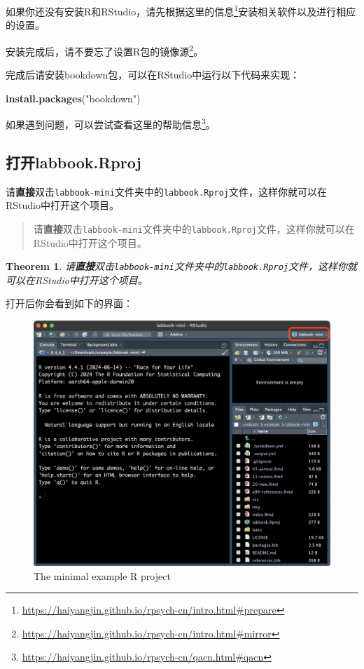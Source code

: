 \documentclass[]{ctexbook}
\newenvironment{Shaded}{\begin{snugshade}}{\end{snugshade}}
\newcommand{\FunctionTok}[1]{\textcolor[rgb]{0.13,0.29,0.53}{\textbf{#1}}}
\newcommand{\NormalTok}[1]{#1}
\newcommand{\StringTok}[1]{\textcolor[rgb]{0.31,0.60,0.02}{#1}}
\renewcommand{\href}[2]{#2\footnote{\url{#1}}}
\newtheorem{theorem}{Theorem}[chapter]
\theoremstyle{definition}
\theoremstyle{definition}
\theoremstyle{definition}
\theoremstyle{definition}
\theoremstyle{remark}
\begin{document}
如果你还没有安装R和RStudio，请先根据\href{https://haiyangjin.github.io/rpsych-cn/intro.html\#prepare}{这里的信息}安装相关软件以及进行相应的设置。

安装完成后，请不要忘了\href{https://haiyangjin.github.io/rpsych-cn/intro.html\#mirror}{设置R包的镜像源}。

完成后请安装bookdown包，可以在RStudio中运行以下代码来实现：

\begin{Shaded}
\begin{Highlighting}[]
\FunctionTok{install.packages}\NormalTok{(}\StringTok{"bookdown"}\NormalTok{)}
\end{Highlighting}
\end{Shaded}

如果遇到问题，可以尝试查看这里的\href{https://haiyangjin.github.io/rpsych-cn/qacn.html\#qacn}{帮助信息}。

\subsection{打开labbook.Rproj}\label{ux6253ux5f00labbook.rproj}

请\textbf{直接}双击\texttt{labbook-mini}文件夹中的\texttt{labbook.Rproj}文件，这样你就可以在RStudio中打开这个项目。

\begin{quote}
请\textbf{直接}双击\texttt{labbook-mini}文件夹中的\texttt{labbook.Rproj}文件，这样你就可以在RStudio中打开这个项目。
\end{quote}

\begin{theorem}
请\textbf{直接}双击\texttt{labbook-mini}文件夹中的\texttt{labbook.Rproj}文件，这样你就可以在RStudio中打开这个项目。
\end{theorem}

打开后你会看到如下的界面：

\begin{figure}

{\centering \includegraphics[width=0.9\linewidth]{img/contribute/mini_rproj} 

}

\caption{The minimal example R project}\label{fig:contri-mini-rproj}
\end{figure}
\end{document}
